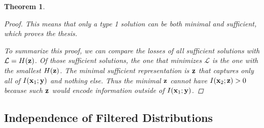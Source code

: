 \documentclass{article} %
\theoremstyle{plain}
\newtheorem{theorem}{Theorem}[section]
\theoremstyle{definition}
\theoremstyle{remark}
\begin{document}
\begin{theorem}
\begin{proof}
This means that only a type 1 solution can be both minimal and sufficient, which proves the thesis. 

To summarize this proof, we can compare the losses of all sufficient solutions with $\mathcal{L} = H({\mathbf{z}})$. Of those sufficient solutions, the one that minimizes $\mathcal{L}$ is the one with the smallest $H({\mathbf{z}})$. The minimal sufficient representation is ${\mathbf{z}}$ that captures only all of $I({\mathbf{x}}_1; {\mathbf{y}})$ and nothing else. Thus the minimal ${\mathbf{z}}$ cannot have $I({\mathbf{x}}_2; {\mathbf{z}}) > 0$ because such ${\mathbf{z}}$ would encode information outside of $I({\mathbf{x}}_1; {\mathbf{y}})$.



\end{proof}
    \label{genloss}


    
\end{theorem}


\subsection{Independence of Filtered Distributions}
\end{document}
